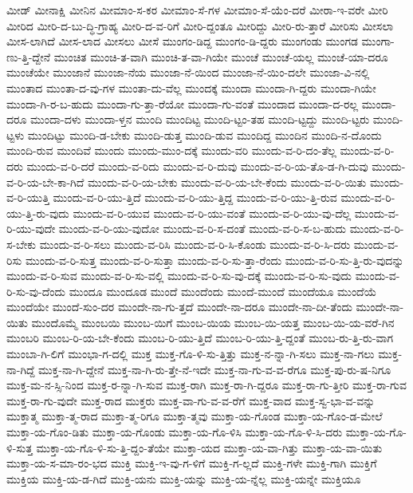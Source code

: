 {ಮೀಡ್
ಮೀನಾಕ್ಷಿ
ಮೀನಿನ
ಮೀಮಾಂ-ಸ-ಕರ
ಮೀಮಾಂ-ಸೆ-ಗಳ
ಮೀಮಾಂ-ಸೆ-ಯೆಂ-ದರೆ
ಮೀರಾ-ಇ-ವರೇ
ಮೀರಿ
ಮೀರಿದ
ಮೀರಿ-ದ-ಬು-ದ್ಧಿ-ಗ್ರಾಹ್ಯ
ಮೀರಿ-ದ-ವ-ರಿಗೆ
ಮೀರಿ-ದ್ದಂತೂ
ಮೀರಿದ್ದು
ಮೀರಿ-ರು-ತ್ತಾರೆ
ಮೀರಿಸು
ಮೀಸಲಾ
ಮೀಸ-ಲಾಗಿದೆ
ಮೀಸ-ಲಾದ
ಮೀಸಲು
ಮೀಸೆ
ಮುಂಗಂ-ಡಿದ್ದ
ಮುಂಗಂ-ಡಿ-ದ್ದರು
ಮುಂಗಂಡು
ಮುಂಗಡ
ಮುಂಗಾ-ಣು-ತ್ತಿ-ದ್ದೇನೆ
ಮುಂಚಿತ
ಮುಂಚಿ-ತ-ವಾಗಿ
ಮುಂಚಿ-ತ-ವಾ-ಗಿಯೇ
ಮುಂಚೆ
ಮುಂಚೆ-ಯಲ್ಲ
ಮುಂಚೆ-ಯಾ-ದರೂ
ಮುಂಚೆಯೇ
ಮುಂಜಾನೆ
ಮುಂಜಾ-ನೆಯ
ಮುಂಜಾ-ನೆ-ಯಿಂದ
ಮುಂಜಾ-ನೆ-ಯಿಂ-ದಲೇ
ಮುಂಜಾ-ವಿ-ನಲ್ಲಿ
ಮುಂತಾದ
ಮುಂತಾ-ದ-ವು-ಗಳ
ಮುಂತಾ-ದು-ವೆಲ್ಲ
ಮುಂದಕ್ಕೆ
ಮುಂದಾ
ಮುಂದಾ-ಗಿ-ದ್ದರು
ಮುಂದಾ-ಗಿಯೇ
ಮುಂದಾ-ಗಿ-ರ-ಬ-ಹುದು
ಮುಂದಾ-ಗು-ತ್ತಾ-ರೆಯೋ
ಮುಂದಾ-ಗು-ವಂತೆ
ಮುಂದಾದ
ಮುಂದಾ-ದ-ರಲ್ಲ
ಮುಂದಾ-ದರೂ
ಮುಂದಾ-ದಳು
ಮುಂದಾ-ಳ್ತನ
ಮುಂದಿ
ಮುಂದಿಟ್ಟ
ಮುಂದಿ-ಟ್ಟಂ-ತಹ
ಮುಂದಿ-ಟ್ಟದ್ದು
ಮುಂದಿ-ಟ್ಟರು
ಮುಂದಿ-ಟ್ಟಳು
ಮುಂದಿಟ್ಟು
ಮುಂದಿ-ಡ-ಬೇಕು
ಮುಂದಿ-ಡುತ್ತ
ಮುಂದಿ-ಡುವ
ಮುಂದಿದ್ದ
ಮುಂದಿನ
ಮುಂದಿ-ನ-ದೊಂದು
ಮುಂದಿ-ರುವ
ಮುಂದಿವೆ
ಮುಂದು
ಮುಂದು-ಮುಂ-ದಕ್ಕೆ
ಮುಂದು-ವರಿ
ಮುಂದು-ವ-ರಿ-ದಂ-ತೆಲ್ಲ
ಮುಂದು-ವ-ರಿ-ದರು
ಮುಂದು-ವ-ರಿ-ದರೆ
ಮುಂದು-ವ-ರಿದು
ಮುಂದು-ವ-ರಿ-ದುವು
ಮುಂದು-ವ-ರಿ-ಯ-ತೊ-ಡ-ಗಿ-ದುವು
ಮುಂದು-ವ-ರಿ-ಯ-ಬೇ-ಕಾ-ಗಿದೆ
ಮುಂದು-ವ-ರಿ-ಯ-ಬೇಕು
ಮುಂದು-ವ-ರಿ-ಯ-ಬೇ-ಕೆಂದು
ಮುಂದು-ವ-ರಿ-ಯಿತು
ಮುಂದು-ವ-ರಿ-ಯುತ್ತಿ
ಮುಂದು-ವ-ರಿ-ಯು-ತ್ತಿದೆ
ಮುಂದು-ವ-ರಿ-ಯು-ತ್ತಿದ್ದ
ಮುಂದು-ವ-ರಿ-ಯು-ತ್ತಿ-ರುವ
ಮುಂದು-ವ-ರಿ-ಯು-ತ್ತಿ-ರು-ವುದು
ಮುಂದು-ವ-ರಿ-ಯುವ
ಮುಂದು-ವ-ರಿ-ಯು-ವಂತೆ
ಮುಂದು-ವ-ರಿ-ಯು-ವು-ದೆಲ್ಲ
ಮುಂದು-ವ-ರಿ-ಯು-ವುದೇ
ಮುಂದು-ವ-ರಿ-ಯು-ವುದೋ
ಮುಂದು-ವ-ರಿ-ಸ-ದಂತೆ
ಮುಂದು-ವ-ರಿ-ಸ-ಬ-ಹುದು
ಮುಂದು-ವ-ರಿ-ಸ-ಬೇಕು
ಮುಂದು-ವ-ರಿ-ಸಲು
ಮುಂದು-ವ-ರಿಸಿ
ಮುಂದು-ವ-ರಿ-ಸಿ-ಕೊಂಡು
ಮುಂದು-ವ-ರಿ-ಸಿ-ದರು
ಮುಂದು-ವ-ರಿಸು
ಮುಂದು-ವ-ರಿ-ಸುತ್ತ
ಮುಂದು-ವ-ರಿ-ಸುತ್ತಾ
ಮುಂದು-ವ-ರಿ-ಸು-ತ್ತಾ-ರೆಂದು
ಮುಂದು-ವ-ರಿ-ಸು-ತ್ತಿ-ರು-ವುದನ್ನು
ಮುಂದು-ವ-ರಿ-ಸುವ
ಮುಂದು-ವ-ರಿ-ಸು-ವಲ್ಲಿ
ಮುಂದು-ವ-ರಿ-ಸು-ವು-ದಕ್ಕೆ
ಮುಂದು-ವ-ರಿ-ಸು-ವುದು
ಮುಂದು-ವ-ರಿ-ಸು-ವು-ದೆಂದು
ಮುಂದೂ
ಮುಂದೂಡ
ಮುಂದೆ
ಮುಂದೆಂದು
ಮುಂದೆ-ಮುಂದೆ
ಮುಂದೆಯೂ
ಮುಂದೆಯೆ
ಮುಂದೆಯೇ
ಮುಂದೆ-ಸುಂ-ದರ
ಮುಂದೇ-ನಾ-ಗು-ತ್ತದೆ
ಮುಂದೇ-ನಾ-ದರೂ
ಮುಂದೇ-ನಾ-ದೀ-ತೆಂದು
ಮುಂದೇ-ನಾ-ಯಿತು
ಮುಂದೊಮ್ಮೆ
ಮುಂಬಯಿ
ಮುಂಬ-ಯಿಗೆ
ಮುಂಬ-ಯಿಯ
ಮುಂಬ-ಯಿ-ಯತ್ತ
ಮುಂಬ-ಯಿ-ಯ-ವರೆ-ಗಿನ
ಮುಂಬರಿ
ಮುಂಬ-ರಿ-ಯ-ಬೇ-ಕೆಂದು
ಮುಂಬ-ರಿ-ಯು-ತ್ತಿದೆ
ಮುಂಬ-ರಿ-ಯು-ತ್ತಿ-ದ್ದಂತೆ
ಮುಂಬ-ರು-ತ್ತಿ-ರು-ವಾಗ
ಮುಂಬಾ-ಗಿ-ಲಿಗೆ
ಮುಂಭಾ-ಗ-ದಲ್ಲಿ
ಮುಕ್ತ
ಮುಕ್ತ-ಗೊ-ಳಿ-ಸು-ತ್ತಿತ್ತು
ಮುಕ್ತ-ನ-ನ್ನಾ-ಗಿ-ಸಲು
ಮುಕ್ತ-ನಾ-ಗಲು
ಮುಕ್ತ-ನಾ-ಗಿದ್ದೆ
ಮುಕ್ತ-ನಾ-ಗಿ-ದ್ದೇನೆ
ಮುಕ್ತ-ನಾ-ಗಿ-ರು-ತ್ತೇ-ನೆ-ಇದೇ
ಮುಕ್ತ-ನಾ-ಗು-ವ-ವ-ರೆಗೂ
ಮುಕ್ತ-ಪು-ರು-ಷ-ನಿಗೂ
ಮುಕ್ತ-ಮ-ನ-ಸ್ಸಿ-ನಿಂದ
ಮುಕ್ತ-ರ-ನ್ನಾ-ಗಿ-ಸುವ
ಮುಕ್ತ-ರಾಗಿ
ಮುಕ್ತ-ರಾ-ಗಿ-ದ್ದರೂ
ಮುಕ್ತ-ರಾ-ಗು-ತ್ತೀರಿ
ಮುಕ್ತ-ರಾ-ಗುವ
ಮುಕ್ತ-ರಾ-ಗು-ವುದೇ
ಮುಕ್ತ-ರಾದ
ಮುಕ್ತರು
ಮುಕ್ತ-ವಾ-ಗು-ವ-ವ-ರೆಗೆ
ಮುಕ್ತ-ವಾದ
ಮುಕ್ತ-ಸ್ವ-ಭಾ-ವ-ವನ್ನು
ಮುಕ್ತಾತ್ಮ
ಮುಕ್ತಾ-ತ್ಮ-ರಾದ
ಮುಕ್ತಾ-ತ್ಮ-ರಿಗೂ
ಮುಕ್ತಾ-ತ್ಮವು
ಮುಕ್ತಾ-ಯ-ಗೊಂಡ
ಮುಕ್ತಾ-ಯ-ಗೊಂ-ಡ-ಮೇಲೆ
ಮುಕ್ತಾ-ಯ-ಗೊಂ-ಡಿತು
ಮುಕ್ತಾ-ಯ-ಗೊಂಡು
ಮುಕ್ತಾ-ಯ-ಗೊ-ಳಿಸಿ
ಮುಕ್ತಾ-ಯ-ಗೊ-ಳಿ-ಸಿ-ದರು
ಮುಕ್ತಾ-ಯ-ಗೊ-ಳಿ-ಸುತ್ತ
ಮುಕ್ತಾ-ಯ-ಗೊ-ಳಿ-ಸು-ತ್ತಿ-ದ್ದಂ-ತೆಯೇ
ಮುಕ್ತಾ-ಯದ
ಮುಕ್ತಾ-ಯ-ವಾ-ಗಿತ್ತು
ಮುಕ್ತಾ-ಯ-ವಾ-ಯಿತು
ಮುಕ್ತಾ-ಯ-ಸ-ಮಾ-ರಂ-ಭದ
ಮುಕ್ತಿ
ಮುಕ್ತಿ-ಇ-ವು-ಗ-ಳಿಗೆ
ಮುಕ್ತಿ-ಗ-ಲ್ಲದೆ
ಮುಕ್ತಿ-ಗಳೇ
ಮುಕ್ತಿ-ಗಾಗಿ
ಮುಕ್ತಿಗೆ
ಮುಕ್ತಿಯ
ಮುಕ್ತಿ-ಯ-ಡ-ಗಿದೆ
ಮುಕ್ತಿ-ಯನು
ಮುಕ್ತಿ-ಯನ್ನು
ಮುಕ್ತಿ-ಯ-ನ್ನೆಲ್ಲ
ಮುಕ್ತಿ-ಯನ್ನೇ
ಮುಕ್ತಿಯೂ
}
